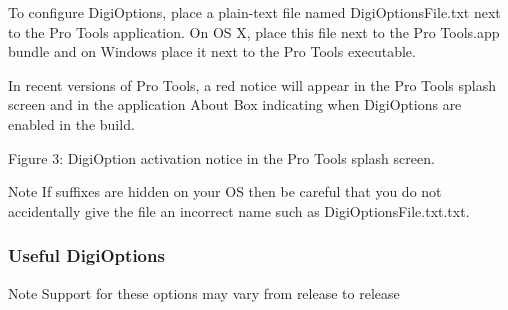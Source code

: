 To configure Digi\+Options, place a plain-\/text file named Digi\+Options\+File.\+txt next to the Pro Tools application. On OS X, place this file next to the Pro Tools.\+app bundle and on Windows place it next to the Pro Tools executable.

In recent versions of Pro Tools, a red notice will appear in the Pro Tools splash screen and in the application About Box indicating when Digi\+Options are enabled in the build.

  Figure 3\+: Digi\+Option activation notice in the Pro Tools splash screen.

 \begin{DoxyNote}{Note}
If suffixes are hidden on your OS then be careful that you do not accidentally give the file an incorrect name such as Digi\+Options\+File.\+txt.\+txt.
\end{DoxyNote}
\hypertarget{a00830_subsection__useful_digioptions}{}\subsubsection{Useful Digi\+Options}\label{a00830_subsection__useful_digioptions}
 \begin{DoxyNote}{Note}
Support for these options may vary from release to release
\end{DoxyNote}

